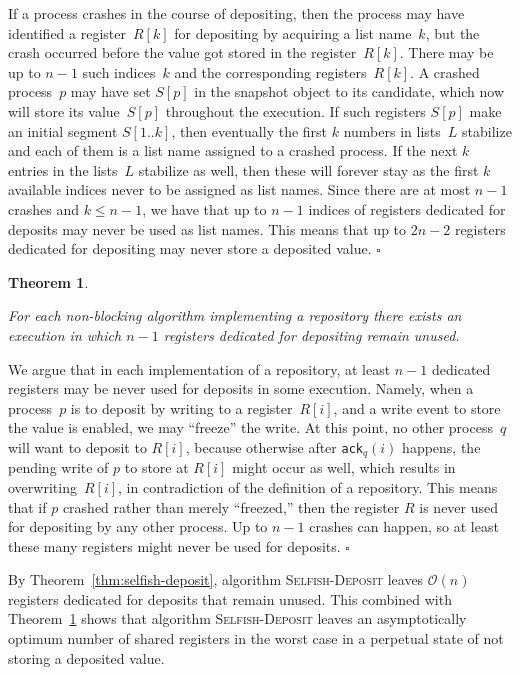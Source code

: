 \documentclass[11pt]{article}
\newcommand{\cO}{\mathcal{O}}
\newcommand{\qed}{\hfill $\square$ \smallbreak}
\newenvironment{proof}{\noindent{\bf Proof:}}{\qed}
\newtheorem{theorem}{Theorem}
\begin{document}
\begin{proof}
If a process crashes in the course of depositing, then the process may have identified  a register~$R[k]$ for depositing by acquiring a list name~$k$, but the crash occurred before the value got stored in the register~$R[k]$.
There may be up to $n-1$ such indices~$k$ and the corresponding registers~$R[k]$.
A crashed process~$p$ may have set $S[p]$ in the snapshot object to its candidate, which now will store its value~$S[p]$ throughout the execution.
If such registers $S[p]$ make an initial segment $S[1..k]$, then eventually the first $k$ numbers in lists~$L$ stabilize and each of them is a list name assigned to a crashed process. 
If the next $k$ entries in the lists~$L$ stabilize as well, then these will forever stay as the first $k$ available indices never to be assigned as list names.
Since there are at most $n-1$ crashes and $k\le n-1$,  we have that up to $n-1$ indices of registers dedicated for deposits may never be used as list names.
This means that up to $2n-2$ registers dedicated for depositing may never store a deposited value.
\end{proof} 





\begin{theorem}
\label{thm:non-blocking-repository}

For each non-blocking algorithm implementing a repository there exists an execution in which $n-1$ registers dedicated for depositing remain unused. 
\end{theorem}

\begin{proof}
We argue that in each implementation of a repository, at least $n-1$ dedicated registers may be never used for deposits in some execution.
Namely, when a process~$p$ is to deposit by writing to a register~$R[i]$, and a write event to store the value is enabled, we may ``freeze'' the write.
At this point, no  other process~$q$ will want to deposit to $R[i]$, because otherwise after \texttt{ack}$_q(i)$ happens, the pending write of $p$ to store at $R[i]$ might occur as well, which results in overwriting~$R[i]$, in contradiction of the definition of a repository.
This means that if $p$ crashed rather than merely ``freezed,'' then the register $R$ is never used for depositing by any other process. 
Up to $n-1$ crashes can happen, so at least these many registers might never be used for deposits.
\end{proof}

By Theorem~\ref{thm:selfish-deposit}, algorithm \textsc{Selfish-Deposit} leaves  $\cO(n)$ registers dedicated for deposits that remain unused.
This combined with Theorem~\ref{thm:non-blocking-repository} shows that algorithm \textsc{Selfish-Deposit} leaves an asymptotically optimum number of shared registers in the worst case in a perpetual state of not storing a deposited value.
\end{document}
